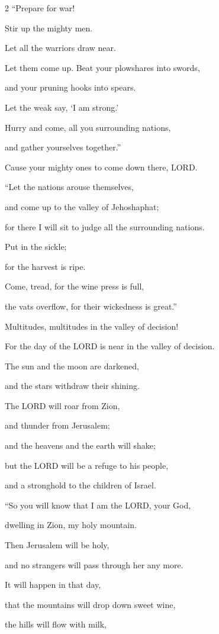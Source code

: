 \begin{multicols}{2}
“Prepare for war!

Stir up the mighty men.

Let all the warriors draw near.

Let them come up.
\myverse{}Beat your plowshares into swords,

and your pruning hooks into spears.

Let the weak say, ‘I am strong.’

\myverse{}Hurry and come, all you surrounding nations,

and gather yourselves together.”

Cause your mighty ones to come down there, LORD.

\myverse{}“Let the nations arouse themselves,

and come up to the valley of Jehoshaphat;

for there I will sit to judge all the surrounding nations.

\myverse{}Put in the sickle;

for the harvest is ripe.

Come, tread, for the wine press is full,

the vats overflow, for their wickedness is great.”

\myverse{}Multitudes, multitudes in the valley of decision!

For the day of the LORD is near in the valley of decision.

\myverse{}The sun and the moon are darkened,

and the stars withdraw their shining.

\myverse{}The LORD will roar from Zion,

and thunder from Jerusalem;

and the heavens and the earth will shake;

but the LORD will be a refuge to his people,

and a stronghold to the children of Israel.

\myverse{}“So you will know that I am the LORD, your God,

dwelling in Zion, my holy mountain.

Then Jerusalem will be holy,

and no strangers will pass through her any more.

\myverse{}It will happen in that day,

that the mountains will drop down sweet wine,

the hills will flow with milk,


\end{multicols}
